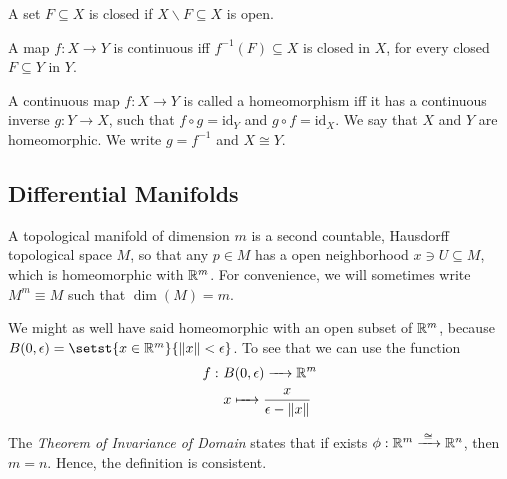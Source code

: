 \begin{definition}
	A set $F\subseteq X$ is closed if $X\backslash F \subseteq X$ is open.
\end{definition}

\begin{proposition}
	A map $f:X\to Y$ is continuous iff $f^{-1}(F) \subseteq X$ is closed in $X$, for every closed $F\subseteq Y$ in $Y$.
\end{proposition}

\begin{definition}
	A continuous map $f:X\to Y$ is called a homeomorphism iff it has a continuous inverse $g:Y\to X$, such that $f \circ g = \mathrm{id}_Y$ and $g \circ f = \mathrm{id}_X$. We say that $X$ and $Y$ are homeomorphic. We write $g=f^{-1}$ and $X \cong Y$. 
\end{definition}

\clearpage

\subsection{Differential Manifolds}

\begin{definition}
	A topological manifold of dimension $m$ is a second countable, Hausdorff topological space $M$, so that any $p \in M$ has a open neighborhood $x \ni U \subseteq M$, which is homeomorphic with $\mathbb R^m$. For convenience, we will sometimes write $M^m\equiv M$ such that $\dim(M)=m$.
\end{definition}

\begin{remark}
	We might as well have said homeomorphic with an open subset of $\mathbb R^m$, because $B(0,\epsilon) = \setst{x\in \bbR^m}{ \norm{x} < \epsilon }$. To see that we can use the function
	\begin{align*}
		f:~&B(0,\epsilon) \to \bbR^m \\
		& x \mapsto \frac{x}{\epsilon-\norm{x}}
	\end{align*}
\end{remark}

\begin{remark}
	The \emph{Theorem of Invariance of Domain} states that if exists $\phi:\mathbb R^m \xrightarrow{\;\cong\;} \mathbb R^n$, then $m=n$. Hence, the definition is consistent.
\end{remark}

